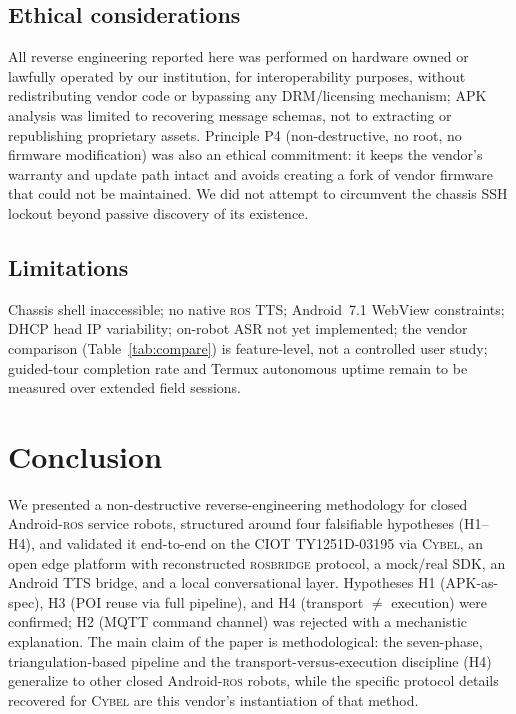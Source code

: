 \documentclass[conference]{IEEEtran}
\newcommand{\ros}{\textsc{ros}}
\newcommand{\rosbridge}{\textsc{rosbridge}}
\newcommand{\cybel}{\textsc{Cybel}}
\begin{document}
\subsection{Ethical considerations}

All reverse engineering reported here was performed on hardware owned or lawfully operated by our institution, for interoperability purposes, without redistributing vendor code or bypassing any DRM/licensing mechanism; APK analysis was limited to recovering message schemas, not to extracting or republishing proprietary assets. Principle P4 (non-destructive, no root, no firmware modification) was also an ethical commitment: it keeps the vendor's warranty and update path intact and avoids creating a fork of vendor firmware that could not be maintained. We did not attempt to circumvent the chassis SSH lockout beyond passive discovery of its existence.

\subsection{Limitations}

Chassis shell inaccessible; no native \ros{} TTS; Android~7.1 WebView constraints; DHCP head IP variability; on-robot ASR not yet implemented; the vendor comparison (Table~\ref{tab:compare}) is feature-level, not a controlled user study; guided-tour completion rate and Termux autonomous uptime remain to be measured over extended field sessions.

\section{Conclusion}

We presented a non-destructive reverse-engineering methodology for closed Android-\ros{} service robots, structured around four falsifiable hypotheses (H1--H4), and validated it end-to-end on the CIOT TY1251D-03195 via \cybel{}, an open edge platform with reconstructed \rosbridge{} protocol, a mock/real SDK, an Android TTS bridge, and a local conversational layer. Hypotheses H1 (APK-as-spec), H3 (POI reuse via full pipeline), and H4 (transport $\neq$ execution) were confirmed; H2 (MQTT command channel) was rejected with a mechanistic explanation.
The main claim of the paper is methodological: the seven-phase, triangulation-based pipeline and the transport-versus-execution discipline (H4) generalize to other closed Android-\ros{} robots, while the specific protocol details recovered for \cybel{} are this vendor's instantiation of that method.
\end{document}
